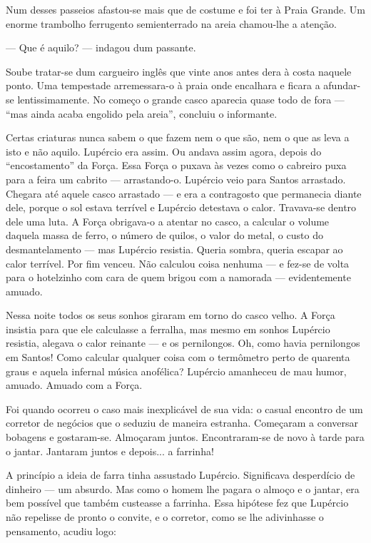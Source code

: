 Num desses passeios afastou-se mais que de costume e foi ter à Praia
Grande. Um enorme trambolho ferrugento semienterrado na areia chamou-lhe
a atenção.

--- Que é aquilo? --- indagou dum passante.

Soube tratar-se dum cargueiro inglês que vinte anos antes dera à costa
naquele ponto. Uma tempestade arremessara-o à praia onde encalhara e
ficara a afundar-se lentissimamente. No começo o grande casco aparecia
quase todo de fora --- ``mas ainda acaba engolido pela areia'', concluiu
o informante.

Certas criaturas nunca sabem o que fazem nem o que são, nem o que as
leva a isto e não aquilo. Lupércio era assim. Ou andava assim agora,
depois do ``encostamento'' da Força. Essa Força o puxava às vezes como o
cabreiro puxa para a feira um cabrito --- arrastando-o. Lupércio veio
para Santos arrastado. Chegara até aquele casco arrastado --- e era a
contragosto que permanecia diante dele, porque o sol estava terrível e
Lupércio detestava o calor. Travava-se dentro dele uma luta. A Força
obrigava-o a atentar no casco, a calcular o volume daquela massa de
ferro, o número de quilos, o valor do metal, o custo do desmantelamento
--- mas Lupércio resistia. Queria sombra, queria escapar ao calor
terrível. Por fim venceu. Não calculou coisa nenhuma --- e fez-se de
volta para o hotelzinho com cara de quem brigou com a namorada ---
evidentemente amuado.

Nessa noite todos os seus sonhos giraram em torno do casco velho. A
Força insistia para que ele calculasse a ferralha, mas mesmo em sonhos
Lupércio resistia, alegava o calor reinante --- e os pernilongos. Oh,
como havia pernilongos em Santos! Como calcular qualquer coisa com o
termômetro perto de quarenta graus e aquela infernal música anofélica?
Lupércio amanheceu de mau humor, amuado. Amuado com a Força.

Foi quando ocorreu o caso mais inexplicável de sua vida: o casual
encontro de um corretor de negócios que o seduziu de maneira estranha.
Começaram a conversar bobagens e gostaram-se. Almoçaram juntos.
Encontraram-se de novo à tarde para o jantar. Jantaram juntos e
depois... a farrinha!

A princípio a ideia de farra tinha assustado Lupércio. Significava
desperdício de dinheiro --- um absurdo. Mas como o homem lhe pagara o
almoço e o jantar, era bem possível que também custeasse a farrinha.
Essa hipótese fez que Lupércio não repelisse de pronto o convite, e o
corretor, como se lhe adivinhasse o pensamento, acudiu logo:

